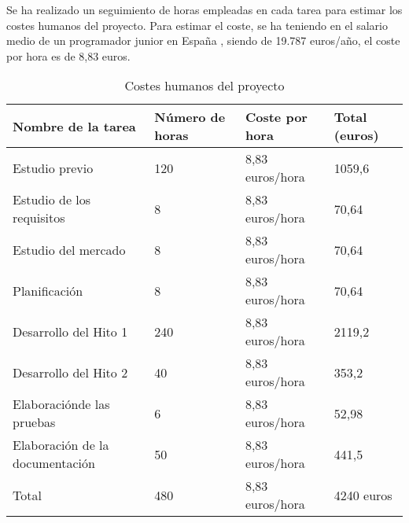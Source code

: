 Se ha realizado un seguimiento de horas empleadas en cada tarea para estimar los costes humanos del proyecto. Para estimar el coste, se ha teniendo en el salario medio de un programador junior en España \cite{infojob}, siendo de 19.787 euros/año, el coste por hora es de 8,83 euros.
\begin{table}[H]
\centering
\caption{Costes humanos del proyecto}
\label{Costes humanos del proyecto}
\begin{tabular}{llll}
\hline
\multicolumn{1}{|l|}{Nombre de la tarea}              & \multicolumn{1}{l|}{Número de horas} & \multicolumn{1}{l|}{Coste por hora}  & \multicolumn{1}{l|}{Total (euros)} \\ \hline
\multicolumn{1}{|l|}{Estudio previo}                  & \multicolumn{1}{l|}{120}             & \multicolumn{1}{l|}{8,83 euros/hora} & \multicolumn{1}{l|}{1059,6}        \\ \hline
\multicolumn{1}{|l|}{Estudio de los requisitos}       & \multicolumn{1}{l|}{8}               & \multicolumn{1}{l|}{8,83 euros/hora} & \multicolumn{1}{l|}{70,64}         \\ \hline
\multicolumn{1}{|l|}{Estudio del mercado}             & \multicolumn{1}{l|}{8}               & \multicolumn{1}{l|}{8,83 euros/hora} & \multicolumn{1}{l|}{70,64}         \\ \hline
\multicolumn{1}{|l|}{Planificación}                   & \multicolumn{1}{l|}{8}               & \multicolumn{1}{l|}{8,83 euros/hora} & \multicolumn{1}{l|}{70,64}         \\ \hline
\multicolumn{1}{|l|}{Desarrollo del Hito 1}           & \multicolumn{1}{l|}{240}             & \multicolumn{1}{l|}{8,83 euros/hora} & \multicolumn{1}{l|}{2119,2}        \\ \hline
\multicolumn{1}{|l|}{Desarrollo del Hito 2}           & \multicolumn{1}{l|}{40}              & \multicolumn{1}{l|}{8,83 euros/hora} & \multicolumn{1}{l|}{353,2}         \\ \hline
\multicolumn{1}{|l|}{Elaboraciónde las pruebas}       & \multicolumn{1}{l|}{6}               & \multicolumn{1}{l|}{8,83 euros/hora} & \multicolumn{1}{l|}{52,98}         \\ \hline
\multicolumn{1}{|l|}{Elaboración de la documentación} & \multicolumn{1}{l|}{50}              & \multicolumn{1}{l|}{8,83 euros/hora} & \multicolumn{1}{l|}{441,5}         \\ \hline
Total                                                 & \cellcolor[HTML]{38FFF8}480          & 8,83 euros/hora                       & \cellcolor[HTML]{96FFFB}4240 euros
\end{tabular}
\end{table}
